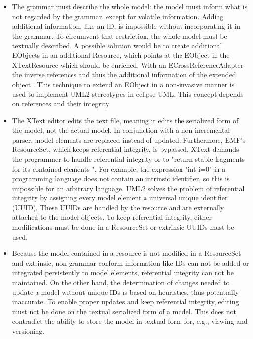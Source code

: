 \begin{itemize}
	\item The grammar must describe the whole model: the model must inform what is not regarded by the grammar, except for volatile information. Adding additional information, like an ID, is impossible without incorporating it in the grammar. To circumvent that restriction, the whole model must be textually described. A possible solution would be to create additional EObjects in an additional Resource, which points at the EObject in the XTextResource which should be enriched. With an ECrossReferenceAdapter the inverse references and thus the additional information of the extended object . This technique to extend an EObject in a non-invasive manner is used to implement UML2 stereotypes in eclipse UML. This concept depends on references and their integrity.
	\item The XText editor edits the text file, meaning it edits the serialized form of the model, not the actual model. In conjunction with a non-incremental parser, model elements are replaced instead of updated. Furthermore, EMF's ResourceSet, which keeps referential integrity, is bypassed. XText demands the programmer to handle referential integrity or to "return stable fragments for its contained elements ". For example, the expression "int i=0" in a programming language does not contain an intrinsic identifier, so this is impossible for an arbitrary language. UML2 solves the problem of referential integrity by assigning every model element a universal unique identifier (UUID). These UUIDs are handled by the resource and are  externally attached to the model objects. To keep referential integrity, either modifications must be done in a ResourceSet or extrinsic UUIDs must be used. 
	\item Because the model contained in a resource is  not modified in a ResourceSet and extrinsic, non-grammar conform information like IDs can not be added or integrated persistently to model elements, referential integrity can not be maintained. On the other hand, the determination of changes needed to update a model without unique IDs is based on heuristics, thus potentially inaccurate.  To enable proper updates and keep referential integrity, editing must not be done on the textual serialized form of a model. This does not contradict the ability to store the model in textual form for, e.g., viewing and versioning. 
\end{itemize}

